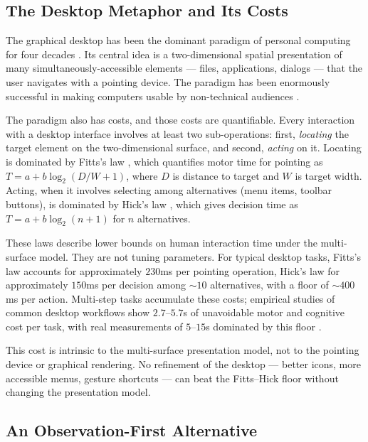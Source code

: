 \documentclass[11pt,a4paper]{article}
\theoremstyle{definition}
\theoremstyle{remark}
\begin{document}
\subsection{The Desktop Metaphor and Its Costs}

The graphical desktop has been the dominant paradigm of personal computing for four decades \citep{kay1977personal, smith1982star, apple1985macintosh}. Its central idea is a two-dimensional spatial presentation of many simultaneously-accessible elements --- files, applications, dialogs --- that the user navigates with a pointing device. The paradigm has been enormously successful in making computers usable by non-technical audiences \citep{shneiderman1983direct}.

The paradigm also has costs, and those costs are quantifiable. Every interaction with a desktop interface involves at least two sub-operations: first, \emph{locating} the target element on the two-dimensional surface, and second, \emph{acting} on it. Locating is dominated by Fitts's law \citep{fitts1954information}, which quantifies motor time for pointing as $T = a + b \log_2(D/W + 1)$, where $D$ is distance to target and $W$ is target width. Acting, when it involves selecting among alternatives (menu items, toolbar buttons), is dominated by Hick's law \citep{hick1952rate}, which gives decision time as $T = a + b \log_2(n+1)$ for $n$ alternatives.

These laws describe lower bounds on human interaction time under the multi-surface model. They are not tuning parameters. For typical desktop tasks, Fitts's law accounts for approximately $230$ms per pointing operation, Hick's law for approximately $150$ms per decision among $\sim 10$ alternatives, with a floor of $\sim 400$ms per action. Multi-step tasks accumulate these costs; empirical studies of common desktop workflows show $2.7$--$5.7$s of unavoidable motor and cognitive cost per task, with real measurements of $5$--$15$s dominated by this floor \citep{card1983psychology}.

This cost is intrinsic to the multi-surface presentation model, not to the pointing device or graphical rendering. No refinement of the desktop --- better icons, more accessible menus, gesture shortcuts --- can beat the Fitts--Hick floor without changing the presentation model.

\subsection{An Observation-First Alternative}
\end{document}
